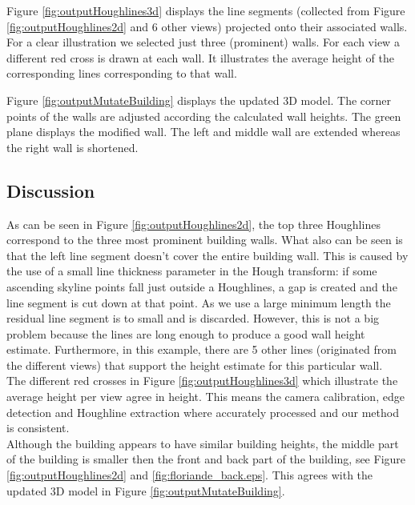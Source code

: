 Figure \ref{fig:outputHoughlines3d} displays the line segments (collected from
Figure \ref{fig:outputHoughlines2d} and 6 other views) projected onto their associated walls.
For a clear illustration we selected just three (prominent) walls.
For each view a different red cross is drawn at each wall. It illustrates the
average height of the corresponding lines corresponding to that wall.
 
Figure \ref{fig:outputMutateBuilding} displays the updated 3D model. The corner
points of the walls are adjusted according the calculated wall heights.  The
green plane displays the modified wall. The left and middle wall are extended
whereas the right wall is shortened.\\


\subsection{Discussion}
As can be seen in Figure \ref{fig:outputHoughlines2d}, 
the top three Houghlines correspond to the three most prominent building walls.
What also can be seen is that the left line segment doesn't cover the entire
building wall. This is caused by the use of
a small line thickness parameter
in the Hough transform: if some ascending skyline points fall just outside
a Houghlines, a gap is created and the line segment is cut down at that point.
As we use a large minimum length the residual line segment is to small and is
discarded.  However, this is not a big problem because the lines are long enough to produce a
good wall height estimate. Furthermore, in this example, there are 5 other lines
(originated from the different views) that support the height estimate for this
particular wall.\\

The different red crosses in Figure \ref{fig:outputHoughlines3d} which illustrate the average height per view 
agree in height. This means the camera calibration, edge detection and Houghline
extraction where accurately processed and our method is consistent. \\

Although the building appears to have similar building heights, the middle part
of the building is smaller then the front and back part of the building, see
Figure \ref{fig:outputHoughlines2d} and \ref{fig:floriande_back.eps}.
This agrees with the updated 3D model in Figure \ref{fig:outputMutateBuilding}.



